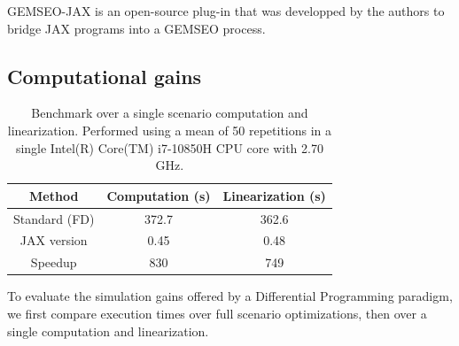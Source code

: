\documentclass[a4paper,fleqn]{cas-dc}
\begin{document}
GEMSEO-JAX \cite{gemseo_jax} is an open-source plug-in that was developped by the authors to bridge JAX programs into a GEMSEO process.

\subsection{Computational gains}
\label{subsec:gains}

\begin{table}[width=\columnwidth,cols=3,pos=h]
    \caption{Benchmark over a single scenario computation and linearization. Performed using a mean of 50 repetitions in a single Intel(R) Core(TM) i7-10850H CPU core with 2.70 GHz.}
    \centering
    \begin{tabular}{c|c c}
    \toprule
    Method & Computation (s)  & Linearization (s)\\
    \midrule
    Standard (FD) & 372.7 & 362.6 \\
    JAX version & 0.45 & 0.48 \\
    \midrule
    Speedup & 830 & 749 \\
    \bottomrule
    \end{tabular}
    \label{tab:execution-linearization}
\end{table}

To evaluate the simulation gains offered by a Differential Programming paradigm, we first compare execution times over full scenario optimizations, then over a single computation and linearization.
\end{document}
